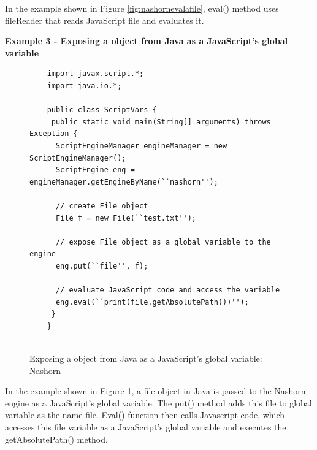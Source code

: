 In the example shown in Figure \ref{fig:nashornevalafile}, eval() method uses fileReader that reads JavaScript file and evaluates it.

\textbf{Example 3 - Exposing a object from Java as a JavaScript's global variable}

\begin{figure}[ht]
	\begin{lstlisting}
	import javax.script.*;
	import java.io.*;
	
	public class ScriptVars {
	 public static void main(String[] arguments) throws Exception {
	  ScriptEngineManager engineManager = new ScriptEngineManager();
	  ScriptEngine eng = engineManager.getEngineByName(``nashorn'');
	
	  // create File object
	  File f = new File(``test.txt'');
	
	  // expose File object as a global variable to the engine
	  eng.put(``file'', f);
	
	  // evaluate JavaScript code and access the variable
	  eng.eval(``print(file.getAbsolutePath())'');
	 }
	}
	
	\end{lstlisting}
	\caption{Exposing a object from Java as a JavaScript's global variable: Nashorn}
	\label{fig:nashornevalaobject}
\end{figure}

In the example shown in Figure \ref{fig:nashornevalaobject}, a file object in Java is passed to the Nashorn engine as a JavaScript's global variable. The put() method adds this file to global variable as the name file. Eval() function then calls Javascript code, which accesses this file variable as a JavaScript's global variable and executes the getAbsolutePath() method.